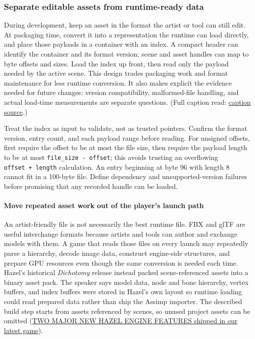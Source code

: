 \subsubsection{Separate editable assets from runtime-ready data}\label{06-engine-ii-ch032-separate-editable-assets-from-runtime-ready-data}

During development, keep an asset in the format the artist or tool can still edit. At packaging time, convert it into a representation the runtime can load directly, and place those payloads in a container with an index. A compact header can identify the container and its format version; scene and asset handles can map to byte offsets and sizes. Load the index up front, then read only the payload needed by the active scene. This design trades packaging work and format maintenance for less runtime conversion. It also makes explicit the evidence needed for future changes: version compatibility, malformed-file handling, and actual load-time measurements are separate questions. (Full caption read: \href{https://www.youtube.com/watch?v=_k4TaZmSteY}{caption source}.)

Treat the index as input to validate, not as trusted pointers. Confirm the format version, entry count, and each payload range before reading. For unsigned offsets, first require the offset to be at most the file size, then require the payload length to be at most \texttt{file\_size\ -\ offset}; this avoids trusting an overflowing \texttt{offset\ +\ length} calculation. An entry beginning at byte 96 with length 8 cannot fit in a 100-byte file. Define dependency and unsupported-version failures before promising that any recorded handle can be loaded.

\paragraph{Move repeated asset work out of the player's launch path}\label{06-engine-ii-ch032-move-repeated-asset-work-out-of-the-players-launch-path}

An artist-friendly file is not necessarily the best runtime file. FBX and glTF are useful interchange formats because artists and tools can author and exchange models with them. A game that reads those files on every launch may repeatedly parse a hierarchy, decode image data, construct engine-side structures, and prepare GPU resources even though the same conversion is needed each time. Hazel's historical \emph{Dichotomy} release instead packed scene-referenced assets into a binary asset pack. The speaker says model data, node and bone hierarchy, vertex buffers, and index buffers were stored in Hazel's own layout so runtime loading could read prepared data rather than ship the Assimp importer. The described build step starts from assets referenced by scenes, so unused project assets can be omitted (\href{https://www.youtube.com/watch?v=VjlKwQoKluI&t=4m28s}{TWO MAJOR NEW HAZEL ENGINE FEATURES shipped in our latest game}).

